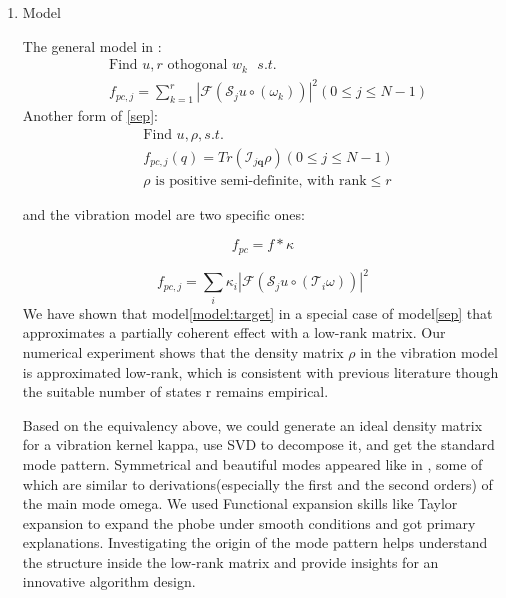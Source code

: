 \documentclass{article}
\numberwithin{equation}{section}
\begin{document}
\begin{enumerate}[leftmargin=*]

\item Model 

The general model in \cite{mix}:
\begin{equation}
\label{sep} 
\begin{aligned}
&\mbox{Find } u, r \mbox{ othogonal $w_k$   }s.t. \\
&f_{p c, j}=\sum_{k=1}^r \left|\mathcal{F}\left( \mathcal{S}_{j} u \circ \left(\omega_k\right) \right)\right|^{2} (0\leq j \leq N-1)
\end{aligned}
\end{equation}
Another form of \ref{sep}:
\begin{equation}
\label{lift}
\begin{aligned}
&\mbox{Find } u,\rho,s.t.\\
&f_{pc,j}(q) = Tr(\mathcal{I}_{j \mathbf{q}} \rho ) (0\leq j \leq N-1)\\
&\rho \mbox{ is positive semi-definite, with rank}\leq r 
\end{aligned}
\end{equation}

 \cite{psf} and the vibration model \cite{chang} are two specific ones:
 
 \begin{equation}
 \label{simple}
     f_{p c}=f * \kappa
 \end{equation}
 
 \begin{equation}
 f_{p c, j}=\sum_{i} \kappa_{i}\left|\mathcal{F}\left( \mathcal{S}_{j} u \circ \left(\mathcal{T}_{i} \omega\right) \right)\right|^{2}
 \label{model:target}
 \end{equation}
We have shown that model\ref{model:target} in a special case of model\ref{sep} that approximates a partially coherent effect with a low-rank matrix. Our numerical experiment shows that the density matrix $\rho$ in the vibration model is approximated low-rank, which is consistent with previous literature though the suitable number of states r remains empirical. 

Based on the equivalency above, we could generate an ideal density matrix for a vibration kernel kappa, use SVD to decompose it, and get the standard mode pattern. Symmetrical and beautiful modes appeared like in \cite{chang}, some of which are similar to derivations(especially the first and the second orders) of the main mode omega. We used Functional expansion skills like Taylor expansion to expand the phobe under smooth conditions and got primary explanations. Investigating the origin of the mode pattern helps understand the structure inside the low-rank matrix and provide insights for an innovative algorithm design.  



\end{enumerate}
\end{document}
